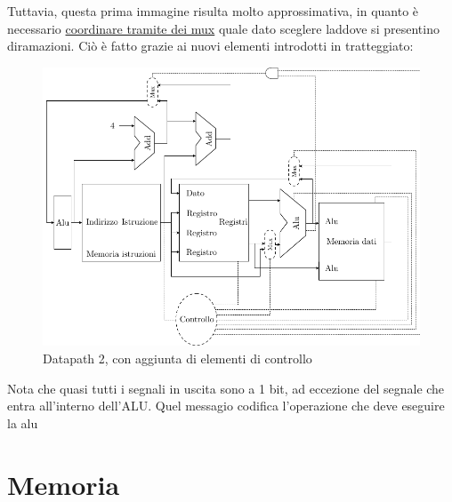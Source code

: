 Tuttavia, questa prima immagine risulta molto approssimativa, in quanto è necessario \underline{coordinare tramite dei mux} quale dato sceglere laddove si presentino diramazioni. Ciò è fatto grazie ai nuovi elementi introdotti in tratteggiato:
\begin{figure}[H]
	\begin{center}
		\includegraphics{Images/Datapath2.pdf}
	\end{center}
	\caption{Datapath 2, con aggiunta di elementi di controllo}
\end{figure}
Nota che quasi tutti i segnali in uscita sono a 1 bit, ad eccezione del segnale che entra all'interno dell'ALU. Quel messagio codifica l'operazione che deve eseguire la alu
\section{Memoria}

